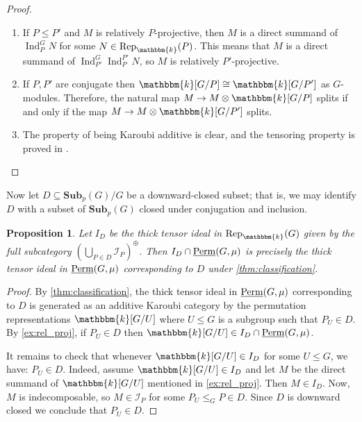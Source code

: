 \documentclass[11pt,a4paper]{amsart}
\theoremstyle{plain}%
\newtheorem{proposition}[lemma]{Proposition}
\theoremstyle{definition}
\theoremstyle{remark}
\newcommand{\Ind}{\operatorname{Ind}}
\newcommand{\Perm}{\underline{{\rm Perm}}}
\newcommand{\Rep}{\operatorname{Rep}}
\newcommand{\kk}{\mathbbm{k}}
\newcommand{\Sub}{\mathbf{Sub}}
\begin{document}
\begin{proof}
\mbox{}

    \begin{enumerate}[itemindent=0pt,leftmargin=*]
    
        \item If $P \leq P'$ and $M$ is relatively $P$-projective, then $M$ is a direct summand of $\Ind^G_P N$ for some $N\in \Rep_{\kk}(P)$. This means that  $M$ is a direct summand of $\Ind^G_{P'} \Ind^{P'}_P N$, so $M$ is relatively $P'$-projective.
                \item If $P, P'$ are conjugate then $\kk[G/P]\cong \kk[G/P']$ as $G$-modules. Therefore, the natural map $M\to   M\otimes \kk[G/P]$ splits if and only if the map $M\to   M\otimes \kk[G/P']$ splits.
        \item The property of being Karoubi additive is clear, and the tensoring property is proved in \cite[Corollary 2.3.5]{Benson}.
 
    \end{enumerate}
\end{proof}
Now let $D \subseteq \Sub_p(G)/G$ be a downward-closed subset; that is, we may identify $D$ with a subset of $\Sub_p(G)$ closed under conjugation and inclusion.
\begin{proposition}
    Let $I_D$ be the thick tensor ideal in $\Rep_{\kk}(G)$ given by the full subcategory $\left(\bigcup_{P\in D} \mathcal{I}_P\right)^{\oplus} $. Then $I_D\cap \Perm(G, \mu)$ is precisely the thick tensor ideal in $\Perm(G, \mu)$ corresponding to $D$ under \cref{thm:classification}.
\end{proposition}
\begin{proof}
    By \cref{thm:classification}, the thick tensor ideal in $\Perm(G, \mu)$ corresponding to $D$ is generated as an additive Karoubi category by the permutation representations $\kk[G/U]$ where $U\leq G$ is a subgroup such that $P_U\in D$. 
    By \cref{ex:rel_proj}, if $P_U\in D$ then $\kk[G/U] \in I_D\cap \Perm(G, \mu)$. 
    
    It remains to check that whenever $\kk[G/U] \in I_D$ for some $U\leq G$, we have: $P_U\in D$. Indeed, assume $\kk[G/U]\in I_D$ and let $M$ be the direct summand of $\kk[G/U]$ mentioned in \cref{ex:rel_proj}. Then $M \in I_D$. Now, $M$ is indecomposable, so $M \in \mathcal{I}_P$ for some $ P_U\leq_G P\in D$. Since $D$ is downward closed we conclude that $P_U\in D$.
\end{proof}


\end{document}
